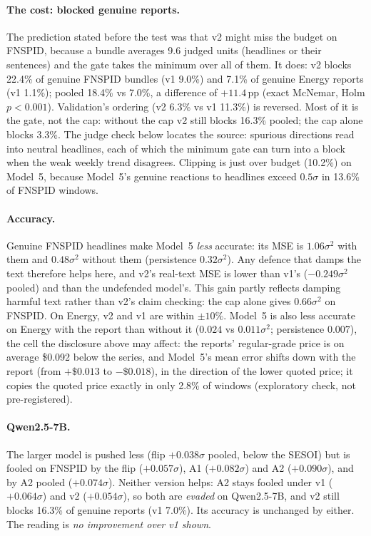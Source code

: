\paragraph{The cost: blocked genuine reports.} The prediction stated before the test was that v2
might miss the budget on FNSPID, because a bundle averages 9.6 judged units (headlines or their
sentences) and the gate takes the minimum over all of them. It does: v2 blocks 22.4\% of genuine
FNSPID bundles (v1 9.0\%) and 7.1\% of genuine Energy reports (v1 1.1\%); pooled 18.4\% vs 7.0\%,
a difference of $+11.4$\,pp (exact McNemar, Holm $p < 0.001$). Validation's ordering (v2 6.3\% vs
v1 11.3\%) is reversed. Most of it is the gate, not the cap: without the cap v2 still blocks
16.3\% pooled; the cap alone blocks 3.3\%. The judge check below locates the source: spurious
directions read into neutral headlines, each of which the minimum gate can turn into a block
when the weak weekly trend disagrees. Clipping is just over budget (10.2\%) on Model~5, because
Model~5's genuine reactions to headlines exceed $0.5\sigma$ in 13.6\% of FNSPID windows.

\paragraph{Accuracy.} Genuine FNSPID headlines make Model~5 \emph{less} accurate: its MSE is
$1.06\sigma^2$ with them and $0.48\sigma^2$ without them (persistence $0.32\sigma^2$). Any defence
that damps the text therefore helps here, and v2's real-text MSE is lower than v1's
($-0.249\sigma^2$ pooled) and than the undefended model's. This gain partly reflects damping
harmful text rather than v2's claim checking: the cap alone gives $0.66\sigma^2$ on FNSPID. On
Energy, v2 and v1 are within $\pm10\%$. Model~5 is also less accurate on Energy with the report
than without it ($0.024$ vs $0.011\sigma^2$; persistence $0.007$), the cell the disclosure above
may affect: the reports' regular-grade price is on average \$0.092 below the series, and Model~5's
mean error shifts down with the report (from $+\$0.013$ to $-\$0.018$), in the direction of the
lower quoted price; it copies the quoted price exactly in only 2.8\% of windows (exploratory check,
not pre-registered).

\paragraph{Qwen2.5-7B.} The larger model is pushed less (flip $+0.038\sigma$ pooled, below the
SESOI) but is fooled on FNSPID by the flip ($+0.057\sigma$), A1 ($+0.082\sigma$) and A2
($+0.090\sigma$), and by A2 pooled ($+0.074\sigma$). Neither version helps: A2 stays fooled under
v1 ($+0.064\sigma$) and v2 ($+0.054\sigma$), so both are \emph{evaded} on Qwen2.5-7B, and v2 still
blocks 16.3\% of genuine reports (v1 7.0\%). Its accuracy is unchanged by either. The reading is
\emph{no improvement over v1 shown}.

